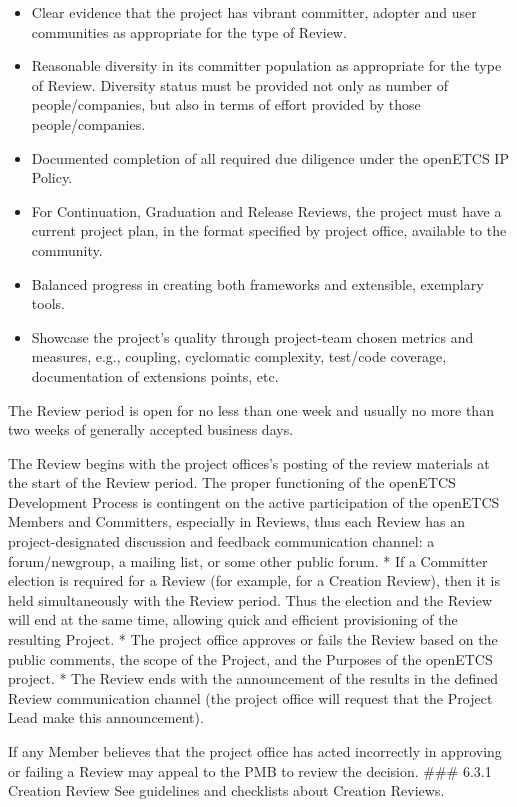 \begin{itemize}

\item
  Clear evidence that the project has vibrant committer, adopter and
  user communities as appropriate for the type of Review.
\item
  Reasonable diversity in its committer population as appropriate for
  the type of Review. Diversity status must be provided not only as
  number of people/companies, but also in terms of effort provided by
  those people/companies.
\item
  Documented completion of all required due diligence under the openETCS
  IP Policy.
\item
  For Continuation, Graduation and Release Reviews, the project must
  have a current project plan, in the format specified by project
  office, available to the community.
\item
  Balanced progress in creating both frameworks and extensible,
  exemplary tools.
\item
  Showcase the project's quality through project-team chosen metrics and
  measures, e.g., coupling, cyclomatic complexity, test/code coverage,
  documentation of extensions points, etc.
\end{itemize}

The Review period is open for no less than one week and usually no more
than two weeks of generally accepted business days.

The Review begins with the project offices's posting of the review
materials at the start of the Review period. The proper functioning of
the openETCS Development Process is contingent on the active
participation of the openETCS Members and Committers, especially in
Reviews, thus each Review has an project-designated discussion and
feedback communication channel: a forum/newgroup, a mailing list, or
some other public forum. * If a Committer election is required for a
Review (for example, for a Creation Review), then it is held
simultaneously with the Review period. Thus the election and the Review
will end at the same time, allowing quick and efficient provisioning of
the resulting Project. * The project office approves or fails the Review
based on the public comments, the scope of the Project, and the Purposes
of the openETCS project. * The Review ends with the announcement of the
results in the defined Review communication channel (the project office
will request that the Project Lead make this announcement).

If any Member believes that the project office has acted incorrectly in
approving or failing a Review may appeal to the PMB to review the
decision. \#\#\# 6.3.1 Creation Review See guidelines and checklists
about Creation Reviews.

